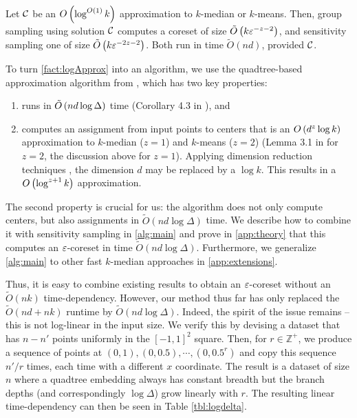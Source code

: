 \begin{fact}\label{fact:logApprox}
Let $\mathcal C$ be an $O\left( \log^{O(1)} k\right)$ approximation to $k$-median or $k$-means.
Then, group sampling using solution $\mathcal C$ computes a coreset of size $\tilde O\left(
k \varepsilon^{-z-2}\right)$, and sensitivity sampling one of size $\tilde O\left( k \varepsilon^{-2z-2}\right)$. 
Both run in time $\tilde O(nd)$, provided $\mathcal C$.
\end{fact}

To turn \cref{fact:logApprox} into an algorithm, we use the quadtree-based \fkmeans approximation algorithm from \cite{cohen2020fast}, which has two key
properties: 
\begin{enumerate}
\item \fkmeans runs in $\tilde O\left( n d \log \Delta\right)$ time (Corollary 4.3 in \cite{cohen2020fast}), and
\item \fkmeans computes an assignment from input points to centers that is an $O\left( d^z \log k\right)$ approximation to $k$-median ($z=1$) and $k$-means ($z=2$)
    (Lemma 3.1 in \cite{cohen2020fast} for $z=2$, the discussion above for $z=1$). Applying dimension reduction techniques \cite{MakarychevMR19}, the dimension
    $d$ may be replaced by a $\log k$. This results in a $O\left(\log^{z+1} k\right)$ approximation.
\end{enumerate}

The second property is crucial for us: the algorithm does not only compute centers, but also assignments in $\tilde{O}(nd\log \Delta)$ time.  We describe how to
combine it with sensitivity sampling in \cref{alg:main} and prove in \cref{app:theory} that this computes an $\varepsilon$-coreset in time $\tilde O(nd \log \Delta)$.
Furthermore, we generalize \cref{alg:main} to other fast $k$-median approaches in \cref{app:extensions}.

Thus, it is easy to combine existing results to obtain an $\varepsilon$-coreset without an $\tilde{O}(nk)$ time-dependency.  However, our method thus far has only
replaced the $\tilde{O}(nd + nk)$ runtime by $\tilde{O}(nd \log \Delta)$. Indeed, the spirit of the issue remains -- this is not log-linear in the input size.
We verify this by devising a dataset that has $n - n'$ points uniformly in the $[-1, 1]^2$ square. Then, for $r \in \mathbb{Z}^+$, we produce a sequence of
points at $(0, 1), (0, 0.5), \cdots, (0, 0.5^r)$ and copy this sequence $n' / r$ times, each time with a different $x$ coordinate. The result is a dataset of
size $n$ where a quadtree embedding always has constant breadth but the branch depths (and correspondingly $\log \Delta$) grow linearly with $r$. The resulting
linear time-dependency can then be seen in Table \ref{tbl:logdelta}.

